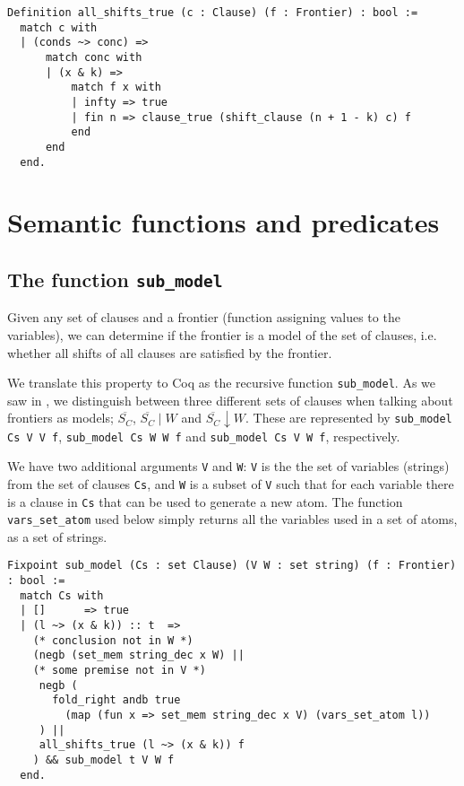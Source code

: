 \begin{minipage}{\linewidth}
\begin{lstlisting}[language=Coq, label={lst:all_shifts_true}, caption={\lstinline{all_shifts_true} in Coq}]
Definition all_shifts_true (c : Clause) (f : Frontier) : bool :=
  match c with
  | (conds ~> conc) =>
      match conc with
      | (x & k) =>
          match f x with
          | infty => true
          | fin n => clause_true (shift_clause (n + 1 - k) c) f
          end
      end
  end.
\end{lstlisting}
\end{minipage}

\section{Semantic functions and predicates}

\subsection{The function \lstinline{sub_model}}

Given any set of clauses and a frontier (function assigning values to the variables),
we can determine if the frontier is a model of the set of clauses, i.e.
whether all shifts of all clauses are satisfied by the frontier.

We translate this property to Coq as the recursive function \lstinline{sub_model}.
As we saw in , we distinguish
between three different sets of clauses when talking about frontiers as models;
$\overline{S_C}$, $\overline{S_C}\mid W$ and $\overline{S_C}\downarrow W$.
These are represented by
\lstinline{sub_model Cs V V f}, \lstinline{sub_model Cs W W f} and \lstinline{sub_model Cs V W f},
respectively.

We have two additional arguments \lstinline{V} and \lstinline{W}:
\lstinline{V} is the the set of variables (strings) from the set of clauses \lstinline{Cs},
and \lstinline{W} is a subset of \lstinline{V} such that for each variable
there is a clause in \lstinline{Cs} that can be used to generate a new atom.
The function \lstinline{vars_set_atom} used below simply returns all the variables
used in a set of atoms, as a set of strings.

\begin{minipage}{\linewidth}
\begin{lstlisting}[language=Coq, label={lst:sub_model_def}, caption={The function \lstinline{sub_model} in Coq}]
Fixpoint sub_model (Cs : set Clause) (V W : set string) (f : Frontier) : bool :=
  match Cs with
  | []      => true
  | (l ~> (x & k)) :: t  =>
    (* conclusion not in W *)
    (negb (set_mem string_dec x W) ||
    (* some premise not in V *)
     negb (
       fold_right andb true
         (map (fun x => set_mem string_dec x V) (vars_set_atom l))
     ) ||
     all_shifts_true (l ~> (x & k)) f
    ) && sub_model t V W f
  end.
\end{lstlisting}
\end{minipage}

